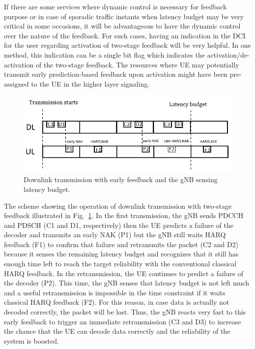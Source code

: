 \documentclass[conference]{IEEEtran}
\begin{document}
If there are some services where dynamic control is necessary for feedback purpose or in case of sporadic traffic instants when latency budget may be very critical in some occasions, it will be advantageous to have the dynamic control over the nature of the feedback. For such cases, having an indication in the DCI for the user regarding activation of two-stage feedback will be very helpful. In one method, this indication can be a single bit flag which indicates the activation/de-activation of the two-stage feedback. The resources where UE may potentially transmit early prediction-based feedback upon activation might have been pre-assigned to the UE in the higher layer signaling.

\begin{figure}[htbp]
\centerline{\includegraphics[scale=0.38]{fig4.png}}
\caption{Downlink transmission with early feedback and the gNB sensing latency budget.}
\label{fig4}
\end{figure}

The scheme showing the operation of downlink transmission with two-stage feedback illustrated in Fig.~\ref{fig4}. In the first transmission, the gNB sends PDCCH and PDSCH (C1 and D1, respectively) then the UE predicts a failure of the decoder and transmits an early NAK (P1) but the gNB still waits HARQ feedback (F1) to confirm that failure and retransmits the packet (C2 and D2) because it senses the remaining latency budget and recognizes that it still has enough time left to reach the target reliability with the conventional classical HARQ feedback. In the retransmission, the UE continues to predict a failure of the decoder (P2). This time, the gNB senses that latency budget is not left much and a useful retransmission is impossible in the time constraint if it waits classical HARQ feedback (F2). For this reason, in case data is actually not decoded correctly, the packet will be lost. Thus, the gNB reacts very fast to this early feedback to trigger an immediate retransmission (C3 and D3) to increase the chance that the UE can decode data correctly and the reliability of the system is boosted.
\end{document}
